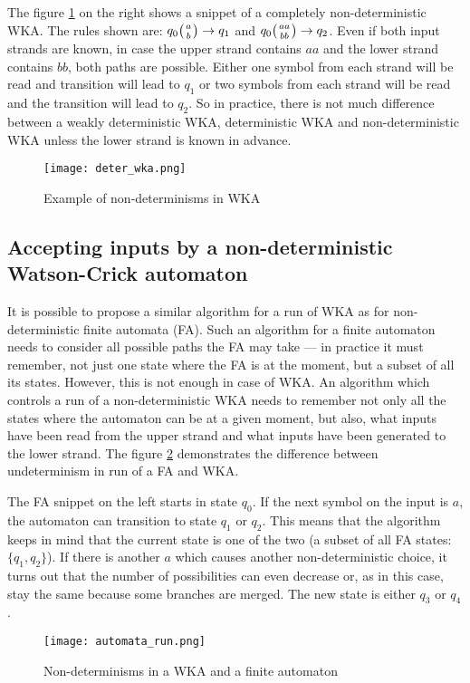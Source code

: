 The figure \ref{fig:deter_WKA} on the right shows a snippet of a completely non-deterministic WKA. The rules shown are: $q_0 \wkpair{a}{b} \rightarrow q_1$ and $q_0 \wkpair{aa}{bb} \rightarrow q_2$. Even if both input strands are known, in case the upper strand contains $aa$ and the lower strand contains $bb$, both paths are possible. Either one symbol from each strand will be read and transition will lead to $q_1$ or two symbols from each strand will be read and the transition will lead to $q_2$. So in practice, there is not much difference between a weakly deterministic WKA, deterministic WKA and non-deterministic WKA unless the lower strand is known in advance.

\begin{figure}[h]
  \centering
  \texttt{[image: deter\_wka.png]}
  \caption{Example of non-determinisms in WKA}
  \label{fig:deter_WKA}
\end{figure}


\subsection{Accepting inputs by a non-deterministic Watson-Crick automaton}
It is possible to propose a similar algorithm for a run of WKA as for non-deterministic finite automata (FA). Such an algorithm for a finite automaton needs to consider all possible paths the FA may take --- in practice it must remember, not just one state where the FA is at the moment, but a subset of all its states. However, this is not enough in case of WKA. An algorithm which controls a run of a non-deterministic WKA needs to remember not only all the states where the automaton can be at a given moment, but also, what inputs have been read from the upper strand and what inputs have been generated to the lower strand. The figure \ref{fig:automata_run} demonstrates the difference between undeterminism in run of a FA and WKA.

The FA snippet on the left starts in state $q_0$. If the next symbol on the input is $a$, the automaton can transition to state $q_1$ or $q_2$. This means that the algorithm keeps in mind that the current state is one of the two (a subset of all FA states: $\{q_1, q_2\}$). If there is another $a$ which causes another non-deterministic choice, it turns out that the number of possibilities can even decrease or, as in this case, stay the same because some branches are merged. The new state is either $q_3$ or $q_4$.

\begin{figure}[h]
  \centering
  \texttt{[image: automata\_run.png]}
  \caption{Non-determinisms in a WKA and a finite automaton}
  \label{fig:automata_run}
\end{figure}

